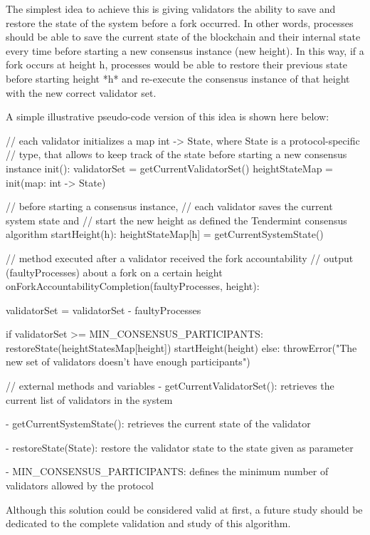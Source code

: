 \documentclass[a4paper,11pt,oneside]{report}
\begin{document}
\begin{markdown}
The simplest idea to achieve this is giving validators the ability to save and restore the state of the system before a fork occurred.
In other words, processes should be able to save the current state of the blockchain and their internal state every time before starting a new consensus instance (new height). In this way, if a fork occurs at height h, processes would be able to restore their previous state before starting height *h* and re-execute the consensus instance of that height with the new correct validator set.

A simple illustrative pseudo-code version of this idea is shown here below:


    // each validator initializes a map int -> State, where State is a protocol-specific
    // type, that allows to keep track of the state before starting a new consensus instance
    init():
        validatorSet = getCurrentValidatorSet()
        heightStateMap = init(map: int -> State)

    // before starting a consensus instance, 
    // each validator saves the current system state and
    // start the new height as defined the Tendermint consensus algorithm
    startHeight(h):
        heightStateMap[h] = getCurrentSystemState()	

    // method executed after a validator received the fork accountability
    // output (faultyProcesses) about a fork on a certain height
    onForkAccountabilityCompletion(faultyProcesses, height):

        validatorSet = validatorSet - faultyProcesses

        if validatorSet >= MIN_CONSENSUS_PARTICIPANTS:
            restoreState(heightStatesMap[height])
            startHeight(height)
        else:
            throwError("The new set of validators doesn't have enough participants")
           
    // external methods and variables
    - getCurrentValidatorSet(): retrieves the current list of validators in the system
    
    - getCurrentSystemState(): retrieves the current state of the validator
    
    - restoreState(State): restore the validator state to the state given as parameter
    
    - MIN_CONSENSUS_PARTICIPANTS: defines the minimum number of validators
    allowed by the protocol
    

Although this solution could be considered valid at first, a future study should be dedicated to the complete validation and study of this algorithm.



\end{markdown}
\end{document}
